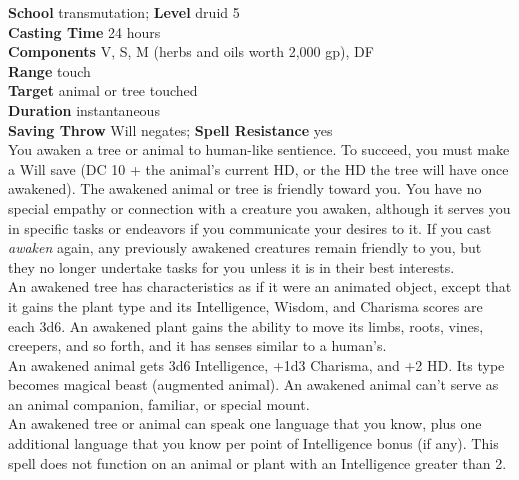 \textbf{School }transmutation; \textbf{Level }druid 5\\
\textbf{Casting Time }24 hours\\
\textbf{Components }V, S, M (herbs and oils worth 2,000 gp), DF\\
\textbf{Range }touch\\
\textbf{Target} animal or tree touched\\
\textbf{Duration }instantaneous\\
\textbf{Saving Throw} Will negates; \textbf{Spell Resistance} yes\\
You awaken a tree or animal to human-like sentience. To succeed, you must make a Will save (DC 10 + the animal's current HD, or the HD the tree will have once awakened). The awakened animal or tree is friendly toward you. You have no special empathy or connection with a creature you awaken, although it serves you in specific tasks or endeavors if you communicate your desires to it. If you cast \textit{awaken} again, any previously awakened creatures remain friendly to you, but they no longer undertake tasks for you unless it is in their best interests.\\
An awakened tree has characteristics as if it were an animated object, except that it gains the plant type and its Intelligence, Wisdom, and Charisma scores are each 3d6. An awakened plant gains the ability to move its limbs, roots, vines, creepers, and so forth, and it has senses similar to a human's.\\
An awakened animal gets 3d6 Intelligence, +1d3 Charisma, and +2 HD. Its type becomes magical beast (augmented animal). An awakened animal can't serve as an animal companion, familiar, or special mount. \\
An awakened tree or animal can speak one language that you know, plus one additional language that you know per point of Intelligence bonus (if any). This spell does not function on an animal or plant with an Intelligence greater than 2.\\
